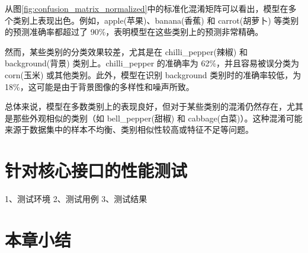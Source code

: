 从图\ref{fig:confusion_matrix_normalized}中的标准化混淆矩阵可以看出，模型在多个类别上表现出色。例如，apple(苹果)、banana(香蕉) 和 carrot(胡萝卜) 等类别的预测准确率都超过了 90\%，表明模型在这些类别上的预测非常精确。

然而，某些类别的分类效果较差，尤其是在 chilli\_pepper(辣椒) 和 background(背景) 类别上。chilli\_pepper 的准确率为 62\%，并且容易被误分类为 corn(玉米) 或其他类别。此外，模型在识别 background 类别时的准确率较低，为 18\%，这可能是由于背景图像的多样性和噪声所致。

总体来说，模型在多数类别上的表现良好，但对于某些类别的混淆仍然存在，尤其是那些外观相似的类别（如 bell\_pepper(甜椒) 和 cabbage(白菜)）。这种混淆可能来源于数据集中的样本不均衡、类别相似性较高或特征不足等问题。

\section{针对核心接口的性能测试}\label{sec:test-performance}

1、测试环境
2、测试用例
3、测试结果

\section{本章小结}